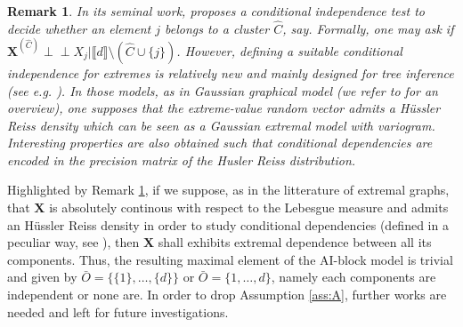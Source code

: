 \documentclass[11pt]{article}
\newtheorem{remark}{Remark}
\newcommand{\indep}{\perp \!\!\! \perp}
\begin{document}
	\begin{remark}
		\label{rem:tree_model}
		In its seminal work, \cite{NIPS2017_37d097ca} proposes a conditional independence test to decide whether an element $j$ belongs to a cluster $\hat{C}$, say. Formally, one may ask if $\textbf{X}^{(\hat{C})} \indep X_j | \llbracket d \rrbracket \setminus (\hat{C} \cup \{j\})$. However, defining a suitable conditional independence for extremes is relatively new and mainly designed for tree inference (see \emph{e.g.} \cite{engelke2020graphical, asenova2021inference, segers2020one, engelke2020structure}). In those models, as in Gaussian graphical model (we refer to \cite{lauritzen1996graphical} for an overview), one supposes that the extreme-value random vector admits a Hüssler Reiss density which can be seen as a Gaussian extremal model with variogram. Interesting properties are also obtained such that conditional dependencies are encoded in the precision matrix of the Husler Reiss distribution.
	\end{remark}
	Highlighted by Remark \ref{rem:tree_model}, if we suppose, as in the litterature of extremal graphs, that $\textbf{X}$ is absolutely continous with respect to the Lebesgue measure and admits an Hüssler Reiss density in order to study conditional dependencies (defined in a peculiar way, see \cite{engelke2020graphical}), then $\textbf{X}$ shall exhibits extremal dependence between all its components. Thus, the resulting maximal element of the AI-block model is trivial and given by $\bar{O} = \{ \{1\}, \dots, \{d\}\}$ or $\bar{O} = \{ 1,\dots,d\}$, namely each components are independent or none are. In order to drop Assumption \ref{ass:A}, further works are needed and left for future investigations.
	
\end{document}

